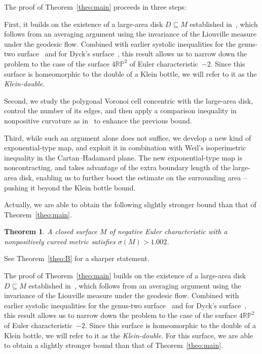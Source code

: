 \documentclass[12pt,reqno]{amsart}
\newtheorem{theoremABC}{Theorem}
\theoremstyle{definition}
\numberwithin{equation}{section}
\newcommand{\RP}{{\mathbb R\mathbb P}}
\numberwithin{equation}{section}
\begin{document}
\medskip

The proof of Theorem~\ref{theo:main} proceeds in three steps:

First, it builds on the existence of a
large-area disk $D\subseteq M$ established in~\cite{KS24}, which follows from an averaging argument using the invariance of the Liouville measure under the geodesic flow.  Combined
with earlier systolic inequalities for the genus-two
surface~\cite{KS06} and for Dyck's surface~\cite{KS15}, this result
allows us to narrow down the problem to the case of the surface
$4\RP^2$ of Euler characteristic~$-2$.  Since this surface is
homeomorphic to the double of a Klein bottle, we will refer to it as
the \emph{Klein-double}.  

Second, we study the polygonal Voronoi cell concentric
with the large-area disk, control the number of its edges, and then
apply a comparison inequality in nonpositive curvature as
in~\cite{KS06} to enhance the previous bound.  

Third, while such an argument alone does not suffice, we develop a new
kind of exponential-type map, and exploit it in combination with
Weil's isoperimetric inequality in the Cartan--Hadamard plane.  The
new exponential-type map is noncontracting, and takes advantage of the
extra boundary length of the large-area disk, enabling us to further
boost the estimate on the surrounding area -- pushing it beyond the
Klein bottle bound.

\medskip


Actually, we are able to obtain the following slightly stronger bound
than that of Theorem~\ref{theo:main}.

\begin{theoremABC}
\label{BB}
A closed surface $M$ of negative Euler characteristic with a
nonpositively curved metric satisfies $\sigma(M) > 1.002$.
\end{theoremABC}
See Theorem~\ref{theo:B} for a sharper statement.

\medskip



\forget

The proof of Theorem~\ref{theo:main} builds on the existence
of a large-area disk $D\subseteq M$ established in~\cite{KS24}, which
follows from an averaging argument using the invariance of the
Liouville measure under the geodesic flow.  Combined with earlier
systolic inequalities for the genus-two surface~\cite{KS06} and for
Dyck's surface~\cite{KS15}, this result allows us to narrow down the
problem to the case of the surface $4\RP^2$ of Euler
characteristic~$-2$.  Since this surface is homeomorphic to the double
of a Klein bottle, we will refer to it as the \emph{Klein-double}.
For this surface, we are able to obtain a slightly stronger bound than
that of Theorem~\ref{theo:main}.
\end{document}
